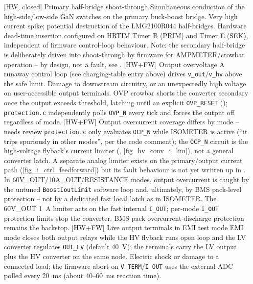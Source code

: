     \begin{FMEATable}
    \FMEAItemMinor
        {[HW, closed] Primary half-bridge shoot-through}
        {Simultaneous conduction of the high-side/low-side \acs{GaN} switches on the primary buck-boost bridge.}
        {Very high current spike; potential destruction of the LMG2100R044 half-bridges.}
        {Hardware dead-time insertion configured on \ac{HRTIM} Timer B (PRIM) and Timer E (SEK), independent of firmware control-loop behaviour. Note: the secondary half-bridge is deliberately driven into shoot-through by firmware for AMPMETER/crowbar operation -- by design, not a fault, see .}
    \FMEAItemCritical
        {[HW+FW] Output overvoltage}
        {A runaway control loop (see charging-table entry above) drives \texttt{v\_out}/\texttt{v\_hv} above the safe limit.}
        {Damage to downstream circuitry, or an unexpectedly high voltage on user-accessible output terminals.}
        {\ac{OVP} crowbar shorts the converter secondary once the output exceeds threshold, latching until an explicit \texttt{OVP\_RESET} (); \texttt{protection.c} independently polls \texttt{OVP\_N} every tick and forces the output off regardless of mode.}
    \FMEAItemModerate
        {[HW+FW] Output overcurrent coverage differs by mode -- needs review}
        {\texttt{protection.c} only evaluates \texttt{OCP\_N} while ISOMETER is active (``it trips spuriously in other modes'', per the code comment); the \texttt{OCP\_N} circuit is the high-voltage flyback's current limiter (, \autoref{fig_hv_conv_i_lim}), not a general converter latch. A separate analog limiter exists on the primary/output current path (\autoref{fig_i_ctrl_feedforward}) but its fault behaviour is not yet written up in .}
        {In 60V\_OUT/10A\_OUT/RESISTANCE modes, output overcurrent is caught by the untuned \texttt{BoostIoutLimit} software loop and, ultimately, by \ac{BMS} pack-level protection -- not by a dedicated fast local latch as in ISOMETER.}
        {The 60V\_OUT \qty{1}{\ampere} limiter acts on the fast internal \texttt{I\_OUT}; per-mode \texttt{I\_OUT} protection limits stop the converter. \ac{BMS} pack overcurrent-discharge protection remains the backstop.}
    \FMEAItemCritical
        {[HW+FW] Live output terminals in EMI test mode}
        {EMI mode closes both output relays while the \ac{HV} flyback runs open loop and the LV converter regulates \texttt{OUT\_LV} (default \qty{40}{\volt}); the terminals carry the LV output plus the \ac{HV} converter on the same node.}
        {Electric shock or damage to a connected load; the firmware abort on \texttt{V\_TERM}/\texttt{I\_OUT} uses the external \ac{ADC} polled every \qty{20}{\milli\second} (about \qty{40}{}--\qty{60}{\milli\second} reaction time).}

\end{FMEATable}
